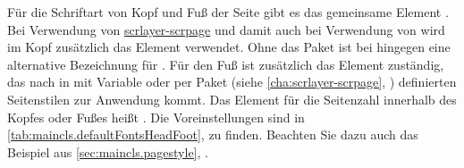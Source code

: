 \BeginIndexGroup {}%
%
%
%
%
\iffalse %
Um die Schriftart von Kopf und Fuß der Seite oder der Seitenangabe zu ändern,
verwenden Sie die Benutzerschnittstelle, die in
\autoref{sec:\LabelBase.textmarkup} beschrieben ist. Für den Kopf und den
Fuß %
\else %
Für die Schriftart von Kopf und Fuß der Seite %
\fi %
gibt es das gemeinsame Element
. Bei
Verwendung von \hyperref[cha:scrlayer-scrpage]{scrlayer-scrpage} und damit
auch bei Verwendung von  wird im Kopf zusätzlich das
Element 
verwendet. Ohne das Paket ist bei  hingegen
 eine alternative Bezeichnung für
. Für den Fuß ist
zusätzlich das Element
 zuständig, das nach
 in mit Variable
 oder per Paket
\hyperref[cha:scrlayer-scrpage]{}%
%
 (siehe
\autoref{cha:scrlayer-scrpage},
) definierten Seitenstilen
zur Anwendung kommt. Das Element für die Seitenzahl innerhalb des Kopfes oder
Fußes heißt . Die
Voreinstellungen sind in \autoref{tab:maincls.defaultFontsHeadFoot},
 zu finden. Beachten Sie dazu
auch das Beispiel aus \autoref{sec:maincls.pagestyle},
.%
%
\EndIndexGroup
%
\EndIndexGroup


